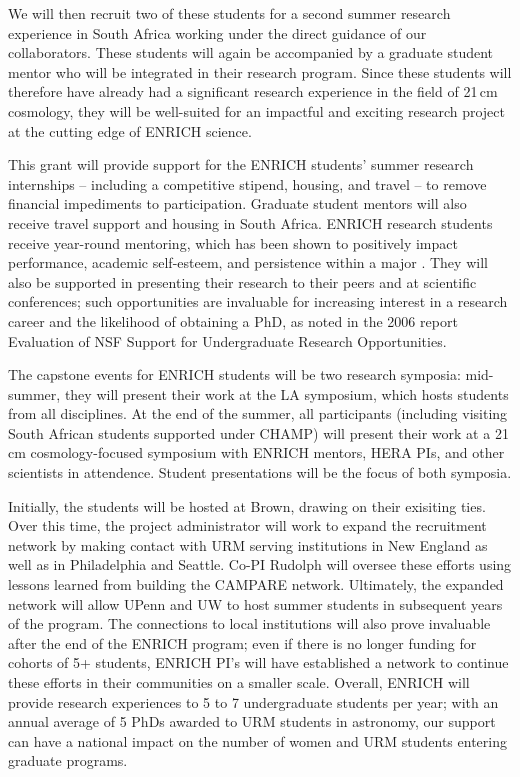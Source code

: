 \documentclass[preprint,11pt]{aastex}
\begin{document}
We will then recruit two of these students for a second summer research experience in South Africa working under the direct guidance of our collaborators.  These students will again be accompanied by a graduate student mentor who will be integrated in their research program.  Since these students will therefore have already had a significant research experience in the field of 21\,cm cosmology, they will be well-suited for an impactful and exciting research project at the cutting edge of ENRICH science.


This grant will provide support for the ENRICH students’ summer research internships -- including a competitive stipend, housing, and travel -- to remove financial impediments to participation.  Graduate student mentors will also receive travel support and housing in South Africa.  ENRICH research students receive year-round mentoring, which has been shown to positively impact performance, academic self-esteem, and persistence within a major \citep{cross_and_vick_2001,armstrong_and_thompson_2003}. They will also be supported in presenting their research to their peers and at scientific conferences; such opportunities are invaluable for increasing interest in a research career and the likelihood of obtaining a PhD, as noted in the 2006 report Evaluation of NSF Support for Undergraduate Research Opportunities.

The capstone events for ENRICH students will be two research symposia: mid-summer, they will present their work at the LA symposium, which hosts students from all disciplines.  At the end of the summer, all participants (including visiting South African students supported under CHAMP) will present their work at a 21\,cm cosmology-focused symposium with ENRICH mentors, HERA PIs, and other scientists in attendence.  Student presentations will be the focus of both symposia.

Initially, the students will be hosted at Brown, drawing on their exisiting ties.  Over this time, the project administrator will work to expand the recruitment network by making contact with URM serving institutions in New England as well as in Philadelphia and Seattle.  Co-PI Rudolph will oversee these efforts using lessons learned from building the CAMPARE network.  Ultimately, the expanded network will allow UPenn and UW to host summer students in subsequent years of the program.  The connections to local institutions will also prove invaluable after the end of the ENRICH program; even if there is no longer funding for cohorts of 5+ students, ENRICH PI's will have established a network to continue these efforts in their communities on a smaller scale.
 Overall, ENRICH will provide research experiences to 5 to 7 undergraduate students per year; with an annual average of 5 PhDs awarded to URM students in astronomy, our support can have a national impact on the number of women and URM students entering graduate programs.
\end{document}
